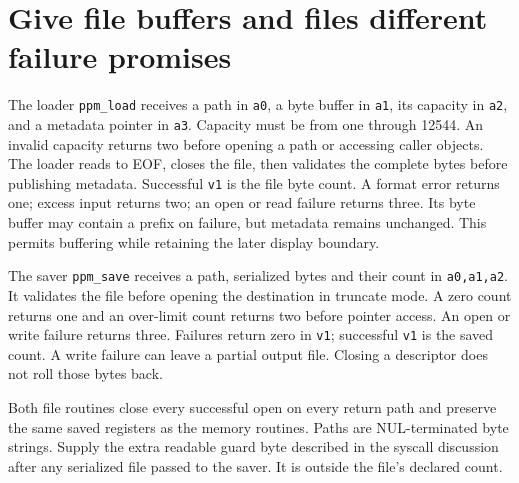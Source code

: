 \section{Give file buffers and files different failure promises}
The loader \texttt{ppm\_load} receives a path in \texttt{a0}, a byte buffer in
\texttt{a1}, its capacity in \texttt{a2}, and a metadata pointer in \texttt{a3}.
Capacity must be from one through 12544. An invalid capacity returns two before opening
a path or accessing caller objects. The loader reads to EOF, closes the file, then
validates the complete bytes before publishing metadata. Successful \texttt{v1} is the
file byte count. A format error returns one; excess input returns two; an open or read
failure returns three. Its byte buffer may contain a prefix on failure, but metadata
remains unchanged. This permits buffering while retaining the later display boundary.

The saver \texttt{ppm\_save} receives a path, serialized bytes and their count in
\texttt{a0,a1,a2}. It validates the file before opening the destination in truncate
mode. A zero count returns one and an over-limit count returns two before pointer
access. An open or write failure returns three. Failures return zero in
\texttt{v1}; successful \texttt{v1} is the saved count. A write failure can leave a
partial output file. Closing a descriptor does not roll those bytes back.

Both file routines close every successful open on every return path and preserve the
same saved registers as the memory routines. Paths are NUL-terminated byte strings.
Supply the extra readable guard byte described in the syscall discussion after any
serialized file passed to the saver. It is outside the file's declared count.
